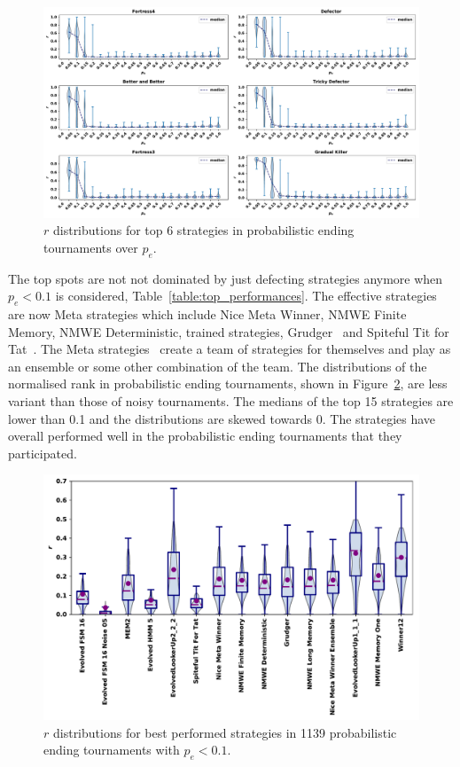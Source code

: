 \documentclass{article}
\begin{document}
\begin{figure}[!htbp]
    \centering
    \includegraphics[width=\textwidth]{../images/folk_theorem.pdf}
    \caption{\(r\) distributions for top 6 strategies in probabilistic ending tournaments
    over $p_e$.}
    \label{fig:effect_of_probend}
\end{figure}

The top spots are not not dominated by just defecting strategies anymore when
\(p_e < 0.1\) is considered, Table~\ref{table:top_performances}. The effective
strategies are now Meta strategies which include Nice Meta Winner, NMWE Finite
Memory, NMWE Deterministic, trained strategies, Grudger~\cite{axelrodproject}
and Spiteful Tit for Tat~\cite{prison}. The Meta
strategies~\cite{axelrodproject} create a team of strategies for themselves and
play as an ensemble or some other combination of the team.
The distributions of the normalised rank in probabilistic ending tournaments,
shown in Figure~\ref{fig:probend_results}, are less variant than those of noisy
tournaments. The medians of the top 15 strategies are lower than 0.1 and the
distributions are skewed towards 0. The strategies have overall performed well
in the probabilistic ending tournaments that they participated.

\begin{figure}[!htbp]
    \centering
    \includegraphics[width=.6\textwidth]{../images/probend_performance_subset.pdf}
    \caption{\(r\) distributions for best performed strategies in 1139 probabilistic ending
    tournaments with \(p_e < 0.1\).}
    \label{fig:probend_results}
\end{figure}
\end{document}
